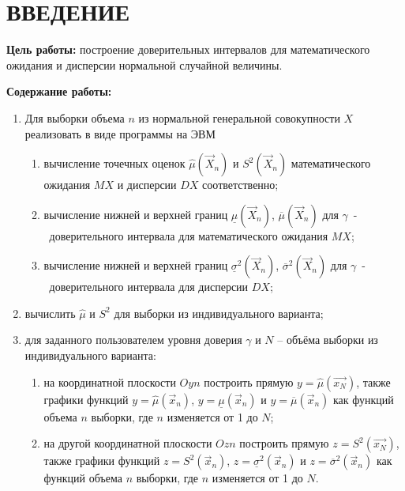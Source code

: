 \chapter*{\hfill{\centering ВВЕДЕНИЕ}\hfill}
\textbf{Цель работы:} построение доверительных интервалов для математического ожидания и дисперсии нормальной случайной величины.

\textbf{Содержание работы:}

\begin{enumerate}
    \item Для выборки объема $n$ из нормальной генеральной совокупности $X$ реализовать в виде программы на ЭВМ
        \begin{enumerate}
            \item вычисление точечных оценок $\hat\mu(\vec X_n)$ и $S^2(\vec X_n)$ математического ожидания $MX$ и дисперсии $DX$ соответственно;
            \item вычисление нижней и верхней границ $\underline\mu(\vec X_n)$, $\overline\mu(\vec X_n)$ для $\gamma$~-~доверительного интервала для математического ожидания $MX$;
            \item вычисление нижней и верхней границ $\underline\sigma^2(\vec X_n)$, $\overline\sigma^2(\vec X_n)$ для $\gamma$~-~доверительного интервала для дисперсии $DX$;
        \end{enumerate}
    \item вычислить $\hat\mu$ и $S^2$ для выборки из индивидуального варианта;
    \item для заданного пользователем уровня доверия $\gamma$ и $N$ – объёма выборки из индивидуального варианта:
        \begin{enumerate}
            \item на координатной плоскости $Oyn$ построить прямую $y = \hat\mu(\vec{x_N})$, также графики функций $y = \hat\mu(\vec x_n)$, $y = \underline\mu(\vec x_n)$ и $y = \overline\mu(\vec x_n)$ как функций объема $n$ выборки, где $n$ изменяется от 1 до $N$;
            \item на другой координатной плоскости $Ozn$ построить прямую $z = S^2(\vec{x_N})$, также графики функций $z = S^2(\vec x_n)$, $z = \underline\sigma^2(\vec x_n)$ и $z = \overline\sigma^2(\vec x_n)$ как функций объема $n$ выборки, где $n$ изменяется от 1 до $N$.
        \end{enumerate}
\end{enumerate}